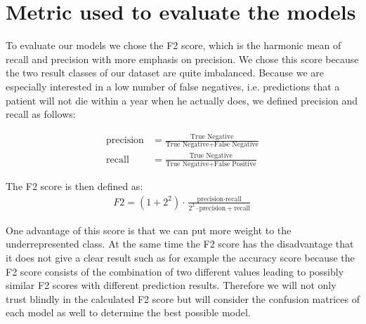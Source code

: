 \section{Metric used to evaluate the models}
To evaluate our models we chose the F2 score, which is the harmonic mean of recall and precision with more emphasis on precision. We chose this score because the two result classes of our dataset are quite imbalanced. Because we are especially interested in a low number of false negatives, i.e. predictions that a patient will not die within a year when he actually does, we defined precision and recall as follows:

\begin{align*}
\text{precision} &= \frac{\text{True Negative}}{\text{True Negative} + \text{False Negative}} \\
\text{recall} &= \frac{\text{True Negative}}{\text{True Negative} + \text{False Positive}}
\end{align*}

The F2 score is then defined as:
\begin{align*}
F2 = (1 + 2^2) \cdot \frac{\text{precision} \cdot \text{recall}}{2^2 \cdot \text{precision} + \text{recall}}
\end{align*}

One advantage of this score is that we can put more weight to the underrepresented class. At the same time the F2 score has the disadvantage that it does not give a clear result such as for example the accuracy score because the F2 score consists of the combination of two different values leading to possibly similar F2 scores with different prediction results. Therefore we will not only trust blindly in the calculated F2 score but will consider the confusion matrices of each model as well to determine the best possible model.

